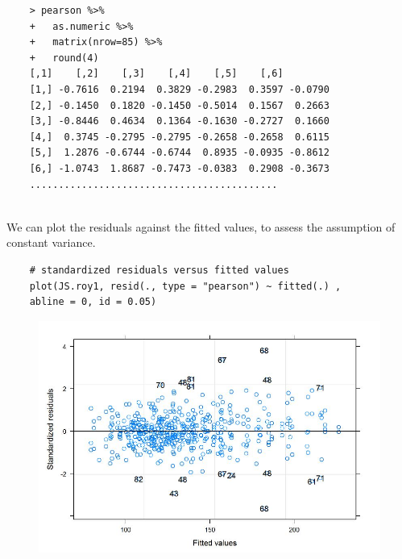 \documentclass[a4paper,12pt]{article}
\begin{document}
\begin{framed}
	\begin{verbatim}
	> pearson %>%
	+   as.numeric %>% 
	+   matrix(nrow=85) %>%
	+   round(4) 
	[,1]    [,2]    [,3]    [,4]    [,5]    [,6]
	[1,] -0.7616  0.2194  0.3829 -0.2983  0.3597 -0.0790
	[2,] -0.1450  0.1820 -0.1450 -0.5014  0.1567  0.2663
	[3,] -0.8446  0.4634  0.1364 -0.1630 -0.2727  0.1660
	[4,]  0.3745 -0.2795 -0.2795 -0.2658 -0.2658  0.6115
	[5,]  1.2876 -0.6744 -0.6744  0.8935 -0.0935 -0.8612
	[6,] -1.0743  1.8687 -0.7473 -0.0383  0.2908 -0.3673
	...........................................
	
	\end{verbatim}
\end{framed}

We can plot the residuals against the fitted values, to assess the assumption of constant variance. 
\begin{framed}
	\begin{verbatim}
	# standardized residuals versus fitted values 
	plot(JS.roy1, resid(., type = "pearson") ~ fitted(.) , 
	abline = 0, id = 0.05)
	\end{verbatim}
\end{framed}
\begin{figure}[h!]
	\centering
	\includegraphics[width=0.9\linewidth]{images/Residuals-JS-Roy}
	\caption{}
	\label{fig:Residuals-JS-Roy}
\end{figure}
\end{document}
